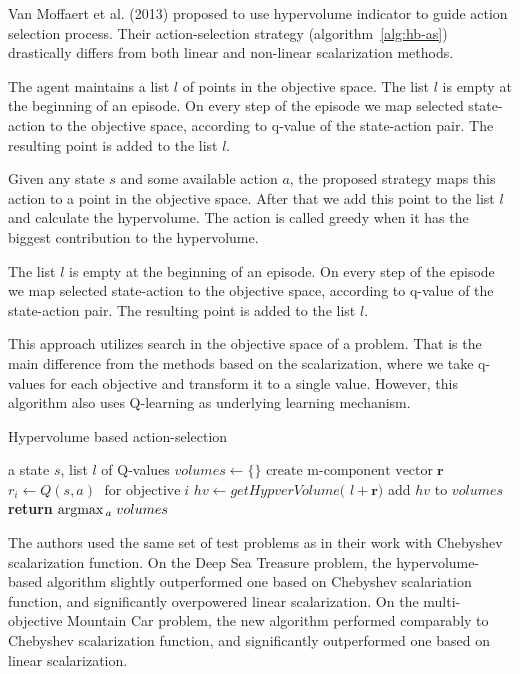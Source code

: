 Van Moffaert et al. (2013)\nocite{van2013hypervolume} proposed to use hypervolume indicator to guide action selection process. Their action-selection strategy (algorithm~\ref{alg:hb-as}) drastically differs from both linear and non-linear scalarization methods.

The agent maintains a list $l$ of points in the objective space. The list $l$ is empty at the beginning of an episode. On every step of the episode we map selected state-action to the objective space, according to q-value of the state-action pair. The resulting point is added to the list $l$.

Given any state $s$ and some available action $a$, the proposed strategy maps this action to a point in the objective space. After that we add this point to the list $l$ and calculate the hypervolume. The action is called greedy when it has the biggest contribution to the hypervolume.

The list $l$ is empty at the beginning of an episode. On every step of the episode we map selected state-action to the objective space, according to q-value of the state-action pair. The resulting point is added to the list $l$.

This approach utilizes search in the objective space of a problem. That is the main difference from the methods based on the scalarization, where we take q-values for each objective and transform it to a single value. However, this algorithm also uses Q-learning as underlying learning mechanism.

\begin{algorithm}[tb]
   \caption{Hypervolume based action-selection}
   \label{alg:hb-as}
\begin{algorithmic}
    a state $s$, list $l$ of Q-values
   \STATE  $volumes \leftarrow \{\} $
       \STATE  $ \text{create m-component vector}\; \textbf{r} $
       \STATE  $ r_{i} \leftarrow Q(s,a)\; \text{ for objective}\;i  $
       \ENDFOR
       \STATE $ hv \leftarrow \textit{getHypverVolume( l} + \textbf{r} \textit{)} $  \STATE add $hv$ to $volumes$
   \ENDFOR
   \STATE \textbf{return} $ \mbox{argmax}\,_{a}\; volumes $
\end{algorithmic}
\end{algorithm}

The authors used the same set of test problems as in their work with Chebyshev scalarization function. On the Deep Sea Treasure problem, the hypervolume-based algorithm slightly outperformed one based on Chebyshev scalariation function, and significantly overpowered linear scalarization. On the multi-objective Mountain Car problem, the new algorithm performed comparably to Chebyshev scalarization function, and significantly outperformed one based on linear scalarization.

